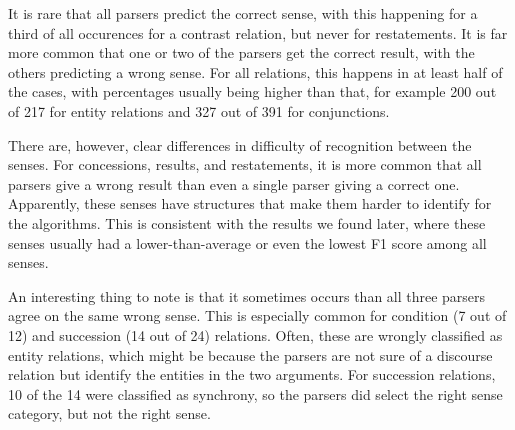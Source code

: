 \documentclass[10pt,notitlepage]{scrartcl}
\begin{document}
It is rare that all parsers predict the correct sense, with this happening for a third of all occurences for a contrast relation, but never for restatements. It is far more common that one or two of the parsers get the correct result, with the others predicting a wrong sense. For all relations, this happens in at least half of the cases, with percentages usually being higher than that, for example 200 out of 217 for entity relations and 327 out of 391 for conjunctions.

There are, however, clear differences in difficulty of recognition between the senses. For concessions, results, and restatements, it is more common that all parsers give a wrong result than even a single parser giving a correct one. Apparently, these senses have structures that make them harder to identify for the algorithms. This is consistent with the results we found later, where these senses usually had a lower-than-average or even the lowest F1 score among all senses.

An interesting thing to note is that it sometimes occurs than all three parsers agree on the same wrong sense. This is especially common for condition (7 out of 12) and succession (14 out of 24) relations. Often, these are wrongly classified as entity relations, which might be because the parsers are not sure of a discourse relation but identify the entities in the two arguments. For succession relations, 10 of the 14 were classified as synchrony, so the parsers did select the right sense category, but not the right sense.
\end{document}

